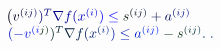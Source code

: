 \documentclass[12pt]{article}
\begin{document}
\makeatletter
\renewcommand*{\@textcolor}[3]{%
  \protect\leavevmode
  \begingroup
    \color#1{#2}#3%
  \endgroup
}
\makeatother
\begin{displaymath}
\begin{array} {rl} & { { } \mathcolor[RGB]{0,0,15}{\left(} \mathcolor[RGB]{0,0,30}{v} ^ { \mathcolor[RGB]{0,0,45}{(} \mathcolor[RGB]{0,0,60}{i} \mathcolor[RGB]{0,0,75}{j} \mathcolor[RGB]{0,0,90}{)} } \mathcolor[RGB]{0,0,105}{)} ^ { \mathcolor[RGB]{0,0,120}{T} } \mathcolor[RGB]{0,0,135}{\nabla} \mathcolor[RGB]{0,0,150}{f} \mathcolor[RGB]{0,0,165}{(} \mathcolor[RGB]{0,0,180}{x} ^ { \mathcolor[RGB]{0,0,195}{(} \mathcolor[RGB]{0,0,210}{i} \mathcolor[RGB]{0,0,225}{)} } \mathcolor[RGB]{0,0,240}{)} \mathcolor[RGB]{0,0,255}{\leq} \mathcolor[RGB]{0,15,0}{s} ^ { \mathcolor[RGB]{0,15,15}{(} \mathcolor[RGB]{0,15,30}{i} \mathcolor[RGB]{0,15,45}{j} \mathcolor[RGB]{0,15,60}{)} } \mathcolor[RGB]{0,15,75}{+} \mathcolor[RGB]{0,15,90}{a} ^ { \mathcolor[RGB]{0,15,105}{(} \mathcolor[RGB]{0,15,120}{i} \mathcolor[RGB]{0,15,135}{j} \mathcolor[RGB]{0,15,150}{)} } \mathcolor[RGB]{0,15,165}{\right.} } \\ & { { } \mathcolor[RGB]{0,15,180}{\left.} \mathcolor[RGB]{0,15,195}{(} \mathcolor[RGB]{0,15,210}{-} \mathcolor[RGB]{0,15,225}{v} ^ { \mathcolor[RGB]{0,15,240}{(} \mathcolor[RGB]{0,15,255}{i} \mathcolor[RGB]{0,30,0}{j} \mathcolor[RGB]{0,30,15}{)} } \mathcolor[RGB]{0,30,30}{)} ^ { \mathcolor[RGB]{0,30,45}{T} } \mathcolor[RGB]{0,30,60}{\nabla} \mathcolor[RGB]{0,30,75}{f} \mathcolor[RGB]{0,30,90}{(} \mathcolor[RGB]{0,30,105}{x} ^ { \mathcolor[RGB]{0,30,120}{(} \mathcolor[RGB]{0,30,135}{i} \mathcolor[RGB]{0,30,150}{)} } \mathcolor[RGB]{0,30,165}{)} \mathcolor[RGB]{0,30,180}{\leq} \mathcolor[RGB]{0,30,195}{a} ^ { \mathcolor[RGB]{0,30,210}{(} \mathcolor[RGB]{0,30,225}{i} \mathcolor[RGB]{0,30,240}{j} \mathcolor[RGB]{0,30,255}{)} } \mathcolor[RGB]{0,45,0}{-} \mathcolor[RGB]{0,45,15}{s} ^ { \mathcolor[RGB]{0,45,30}{(} \mathcolor[RGB]{0,45,45}{i} \mathcolor[RGB]{0,45,60}{j} \mathcolor[RGB]{0,45,75}{)} } \mathcolor[RGB]{0,45,90}{.} \mathcolor[RGB]{0,45,105}{\right.} \mathcolor[RGB]{0,45,120}{.} } \end{array}
\end{displaymath}
\end{document}
